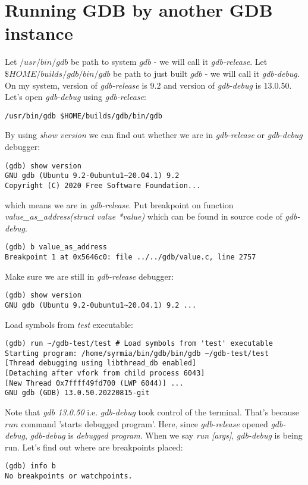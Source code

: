 \documentclass{report}
\begin{document}
\section *{Running GDB by another GDB instance}
Let  $/usr/bin/gdb$ be path to system $gdb$ - we will call it \textit{gdb-release}. Let $\$HOME/builds/gdb/bin/gdb$ be path to just built $gdb$ - we will call it \textit{gdb-debug}.
On my system, version of \textit{gdb-release} is $9.2$ and version of \textit{gdb-debug} is $13.0.50$.
Let's open \textit{gdb-debug} using \textit{gdb-release}:
\begin{verbatim}
/usr/bin/gdb $HOME/builds/gdb/bin/gdb
\end{verbatim}
By using \textit{show version} we can find out whether we are in \textit{gdb-release} or \textit{gdb-debug} debugger:
\begin{verbatim}
(gdb) show version
GNU gdb (Ubuntu 9.2-0ubuntu1~20.04.1) 9.2
Copyright (C) 2020 Free Software Foundation...
\end{verbatim}
which means we are in \textit{gdb-release}. Put breakpoint on function \textit{value\_as\_address(struct value *value)} which can be found in source code of \textit{gdb-debug}.
\begin{verbatim}
(gdb) b value_as_address
Breakpoint 1 at 0x5646c0: file ../../gdb/value.c, line 2757
\end{verbatim}
Make sure we are still in \textit{gdb-release} debugger:
\begin{verbatim}
(gdb) show version
GNU gdb (Ubuntu 9.2-0ubuntu1~20.04.1) 9.2 ...
\end{verbatim}
Load symbols from \textit{test} executable:
\begin{verbatim}
(gdb) run ~/gdb-test/test # Load symbols from 'test' executable
Starting program: /home/syrmia/bin/gdb/bin/gdb ~/gdb-test/test
[Thread debugging using libthread_db enabled]
[Detaching after vfork from child process 6043]
[New Thread 0x7ffff49fd700 (LWP 6044)] ...
GNU gdb (GDB) 13.0.50.20220815-git
\end{verbatim}
Note that \textit{gdb 13.0.50} i.e. \textit{gdb-debug} took control of the terminal. That's because $run$ command 'starts debugged program'. Here, since \textit{gdb-release} opened \textit{gdb-debug}, \textit{gdb-debug} is \textit{debugged program}. When we say \textit{run [args]}, \textit{gdb-debug} is being run. Let's find out where are breakpoints placed:
\begin{verbatim}
(gdb) info b
No breakpoints or watchpoints.
\end{verbatim}
\end{document}

